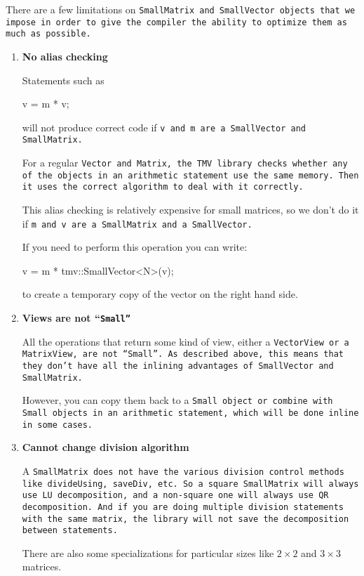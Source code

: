 There are a few limitations on \tt{SmallMatrix} and \tt{SmallVector} objects
that we impose in order to give the compiler the ability to
optimize them as much as possible.

\begin{enumerate}

\item
\textbf{No alias checking}

Statements such as 
\begin{tmvcode}
v = m * v;
\end{tmvcode}
will not produce correct code if \tt{v} and \tt{m} are a \tt{SmallVector} and \tt{SmallMatrix}.  

For a regular \tt{Vector} and \tt{Matrix}, the TMV library checks whether any of 
the objects in an arithmetic statement use the same memory.  
Then it uses the correct algorithm to deal with it 
correctly.  

This alias checking is relatively expensive for small matrices, so we don't do it if
\tt{m} and \tt{v} are a \tt{SmallMatrix} and a \tt{SmallVector}.  

If you need to perform this operation you can write:
\begin{tmvcode}
v = m * tmv::SmallVector<N>(v);
\end{tmvcode}
to create a temporary copy of the vector on the right hand side. 

\item
\textbf{Views are not ``\tt{Small}''}

All the operations that return some kind of view,
either a \tt{VectorView} or a \tt{MatrixView}, are not ``\tt{Small}''.
As described above, this means that they don't have all the inlining advantages of 
\tt{SmallVector} and \tt{SmallMatrix}.  

However, you can copy them back to a \tt{Small} object or combine
with \tt{Small} objects in an arithmetic statement, which will be done inline
in some cases.

\item
\textbf{Cannot change division algorithm}

A \tt{SmallMatrix} does not have the various division control methods 
like \tt{divideUsing}, \tt{saveDiv}, etc.
So a square \tt{SmallMatrix} will always use
LU decomposition, and a non-square one will always use QR decomposition.
And if you are doing multiple division statements with the same matrix,
the library will not save the decomposition between statements.  

There are also some specializations for particular sizes like $2 \times 2$ and $3 \times 3$
matrices.

\end{enumerate}

